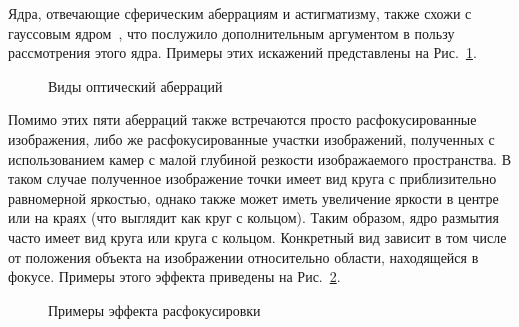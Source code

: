 Ядра, отвечающие сферическим аберрациям и астигматизму, также схожи с гауссовым ядром~\cite{simpkins2014parameterized, simpkins2011modeling}, что послужило дополнительным аргументом в пользу рассмотрения этого ядра. Примеры этих искажений представлены на Рис.~\ref{fig:warping-aberrations}.

\begin{figure}[ht]
	\caption{Виды оптический аберраций~\cite{simpkins2011modeling}}
	\label{fig:warping-aberrations}
\end{figure}

Помимо этих пяти аберраций также встречаются просто расфокусированные изображения, либо же расфокусированные участки изображений, полученных с использованием камер с малой глубиной резкости изображаемого пространства. В таком случае полученное изображение точки имеет вид круга с приблизительно равномерной яркостью, однако также может иметь увеличение яркости в центре или на краях (что выглядит как круг с кольцом). Таким образом, ядро размытия часто имеет вид круга или круга с кольцом. Конкретный вид зависит в том числе от положения объекта на изображении относительно области, находящейся  в фокусе. Примеры этого эффекта приведены на Рис.~\ref{fig:warping-defocus}.

\begin{figure}[ht]
	\caption{Примеры эффекта расфокусировки}
	\label{fig:warping-defocus}
\end{figure}

